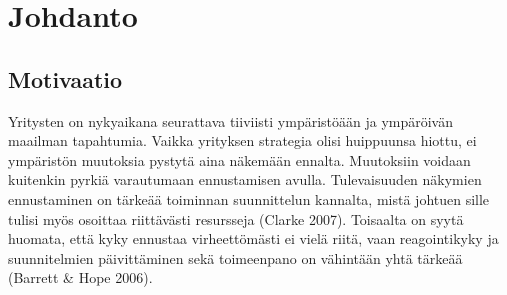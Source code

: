 \documentclass[12pt,a4paper,oneside,pdftex]{report}
\begin{document}


\label{pages-prelude}
\cleardoublepage

\startfirstchapter

\pagestyle{headings}


% 

\chapter{Johdanto}
\label{chapter:johdanto}

\section{Motivaatio}

Yritysten on nykyaikana seurattava tiiviisti ympäristöään ja ympäröivän maailman tapahtumia. Vaikka yrityksen strategia olisi huippuunsa hiottu, ei ympäristön muutoksia pystytä aina näkemään ennalta. Muutoksiin voidaan kuitenkin pyrkiä varautumaan ennustamisen avulla. Tulevaisuuden näkymien ennustaminen on tärkeää toiminnan suunnittelun kannalta, mistä johtuen sille tulisi myös osoittaa riittävästi resursseja (Clarke 2007). Toisaalta on syytä huomata, että kyky ennustaa virheettömästi ei vielä riitä, vaan reagointikyky ja suunnitelmien päivittäminen sekä toimeenpano on vähintään yhtä tärkeää (Barrett & Hope 2006).
\end{document}
